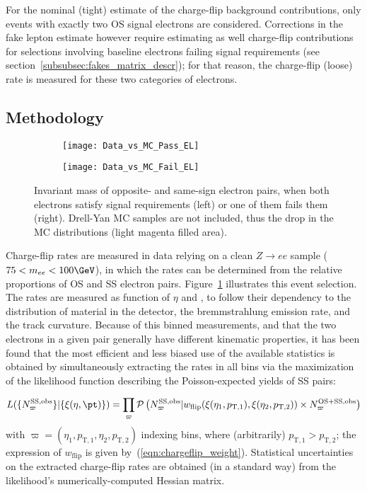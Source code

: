 For the nominal (tight) estimate of the charge-flip background contributions, only events with exactly two OS signal electrons are considered. 
Corrections in the fake lepton estimate however require estimating as well charge-flip contributions for selections involving 
baseline electrons failing signal requirements (see section~\ref{subsubsec:fakes_matrix_descr}); 
for that reason, the charge-flip (loose) rate is measured for these two categories of electrons. 

\subsection*{Methodology}
\label{subsec:chargeflip_method}

\begin{figure}[t!]
\centering
\begin{subfigure}[b]{0.45\textwidth}
	\texttt{[image: Data\_vs\_MC\_Pass\_EL]}
\end{subfigure}
\begin{subfigure}[b]{0.45\textwidth}
	\texttt{[image: Data\_vs\_MC\_Fail\_EL]}
\end{subfigure}
\caption{Invariant mass of opposite- and same-sign electron pairs, 
when both electrons satisfy signal requirements (left) or one of them fails them (right). Drell-Yan MC samples are not included, thus the drop in the MC distributions (light magenta filled area).}
\label{fig:chargeflip_mee}
\end{figure}

Charge-flip rates are measured in data relying on a clean $Z\to ee$ sample ($75<m_{ee}<100 \GeV$), 
in which the rates can be determined from the relative proportions of OS and SS electron pairs. 
Figure~\ref{fig:chargeflip_mee} illustrates this event selection. 
The rates are measured as function of $\eta$ and \pt, to follow their dependency to the distribution of material in the detector, 
the bremmstrahlung emission rate, and the track curvature. 
Because of this binned measurements, and that the two electrons in a given pair generally have different kinematic properties, 
it has been found that the most efficient and less biased use of the available statistics 
is obtained by simultaneously extracting the rates in all bins via the maximization of the likelihood function describing the 
Poisson-expected yields of SS pairs: 

\begin{align}
L(\{N^\text{SS,obs}_\varpi\}|\{\xi(\eta,\pt)\}) 
= \prod_{\varpi} \mathcal P\left(N^\text{SS,obs}_\varpi|w_\text{flip}(\xi(\eta_1,p_{\mathrm{T},1}),\xi(\eta_2,p_{\mathrm{T},2}))\times N^\text{OS+SS,obs}_\varpi\right)
\label{eqn:chargeflip_likelihood}
\end{align}
with $\varpi=(\eta_1,p_{\mathrm{T},1},\eta_2,p_{\mathrm{T},2})$ indexing bins, where (arbitrarily) $p_{\mathrm{T},1}>p_{\mathrm{T},2}$; 
the expression of $w_\text{flip}$ is given by~(\ref{eqn:chargeflip_weight}). 
Statistical uncertainties on the extracted charge-flip rates are obtained (in a standard way) from the likelihood's numerically-computed Hessian matrix. 

